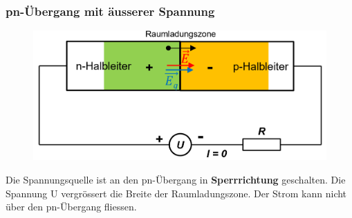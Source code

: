 \begin{minipage}{\linewidth}
        \subsubsection{pn-Übergang mit äusserer Spannung}
    \begin{figure}
       \vspace{-1cm}
        \includegraphics[width=\linewidth]{images/pnuebergengmitu}
    \end{figure}
    Die Spannungsquelle ist an den pn-Übergang in \textbf{Sperrrichtung} geschalten.\newline
    Die Spannung U vergrössert die Breite der Raumladungszone. Der Strom kann nicht über den pn-Übergang fliessen.
\end{minipage}
\clearpage